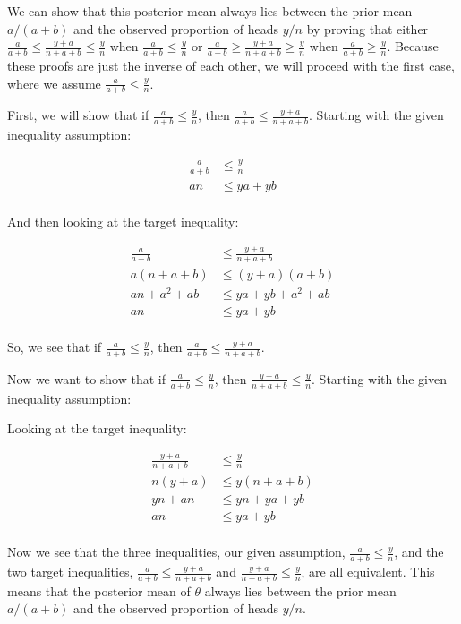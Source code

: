 \documentclass[12pt]{article}
\begin{document}
We can show that this posterior mean always lies between the prior mean $a/(a+b)$ and the observed proportion of heads $y/n$ by proving that either
$\frac{a}{a + b} \leq \frac{y + a}{n + a + b} \leq \frac{y}{n}$ when $\frac{a}{a + b} \leq \frac{y}{n}$
or $\frac{a}{a + b} \geq \frac{y + a}{n + a + b} \geq \frac{y}{n}$ when $\frac{a}{a + b} \geq \frac{y}{n}$. Because these proofs are just the inverse of each other,
we will proceed with the first case, where we assume $\frac{a}{a + b} \leq \frac{y}{n}$.

First, we will show that if $\frac{a}{a + b} \leq \frac{y}{n}$, then $\frac{a}{a + b} \leq \frac{y + a}{n + a + b}$. Starting with the given inequality assumption:

\begin{align*}
\frac{a}{a + b} &\leq \frac{y}{n} \\
an &\leq ya + yb \\
\end{align*}

And then looking at the target inequality:

\begin{align*}
\frac{a}{a + b} &\leq \frac{y + a}{n + a + b} \\
a\left(n+ a + b\right) &\leq \left(y + a\right)\left(a + b\right) \\
an + a^2 + ab &\leq ya + yb + a^2 + ab \\
an &\leq ya + yb \\
\end{align*}

So, we see that if $\frac{a}{a + b} \leq \frac{y}{n}$, then $\frac{a}{a + b} \leq \frac{y + a}{n + a + b}$.

Now we want to show that if $\frac{a}{a + b} \leq \frac{y}{n}$, then $\frac{y + a}{n + a + b} \leq \frac{y}{n}$. Starting with the given inequality assumption:

Looking at the target inequality:

\begin{align*}
\frac{y + a}{n + a + b} &\leq \frac{y}{n} \\
n\left(y + a\right) &\leq y\left(n + a + b\right) \\
yn + an &\leq yn + ya + yb \\
an &\leq ya + yb \\
\end{align*}

Now we see that the three inequalities, our given assumption, $\frac{a}{a + b} \leq \frac{y}{n}$,
and the two target inequalities, $\frac{a}{a + b} \leq \frac{y + a}{n + a + b}$ and $\frac{y + a}{n + a + b} \leq \frac{y}{n}$,
are all equivalent. This means that the posterior mean of $\theta$ always lies between the prior mean $a/(a+b)$ and the observed
proportion of heads $y/n$.
\end{document}
